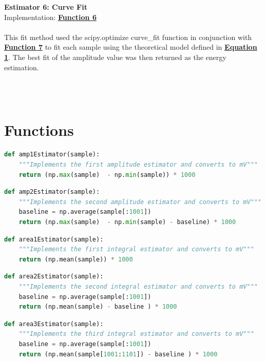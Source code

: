 \documentclass[
	letterpaper, %
	10pt, %
]{template}
\begin{document}
\hfill
\begin{minipage}[t]{.45\textwidth}
{\large \textbf{Estimator 6: Curve Fit}~\label{est-6}}\\
Implementation: \textbf{\hyperref[lst-6]{Function 6}}\\\\
This fit method used the scipy.optimize curve\_fit function in conjunction with \textbf{\hyperref[lst-7]{Function 7}} to fit each sample using the theoretical model defined in \textbf{\hyperref[eqn-1]{Equation 1}}. The best fit of the amplitude value was then returned as the energy estimation.
\end{minipage}\\\\
\newpage

\section{Functions}
\begin{lstlisting}[caption={\label{lst-1}Implementation of \textbf{\hyperref[est-1]{Estimator 1}}},captionpos=b,language=python]
def amp1Estimator(sample):
    """Implements the first amplitude estimator and converts to mV"""
    return (np.max(sample)  - np.min(sample)) * 1000
\end{lstlisting}
\begin{lstlisting}[caption={\label{lst-2}Implementation of  \textbf{\hyperref[est-2]{Estimator 2}}},captionpos=b,language=python]
def amp2Estimator(sample):
    """Implements the second amplitude estimator and converts to mV"""
    baseline = np.average(sample[:1001])
    return (np.max(sample)  - np.min(sample) - baseline) * 1000
\end{lstlisting}
\begin{lstlisting}[caption={\label{lst-3}Implementation of  \textbf{\hyperref[est-3]{Estimator 3}}},captionpos=b,language=python]
def area1Estimator(sample):
    """Implements the first integral estimator and converts to mV"""
    return (np.mean(sample)) * 1000
\end{lstlisting}
\begin{lstlisting}[caption={\label{lst-4}Implementation of  \textbf{\hyperref[est-4]{Estimator 4}}},captionpos=b,language=python]
def area2Estimator(sample):
    """Implements the second integral estimator and converts to mV"""
    baseline = np.average(sample[:1001])
    return (np.mean(sample) - baseline ) * 1000
\end{lstlisting}
\begin{lstlisting}[caption={\label{lst-5}Implementation of  \textbf{\hyperref[est-5]{Estimator 5}}},captionpos=b,language=python]
def area3Estimator(sample):
    """Implements the third integral estimator and converts to mV"""
    baseline = np.average(sample[:1001])
    return (np.mean(sample[1001:1101]) - baseline ) * 1000
\end{lstlisting}
\end{document}
